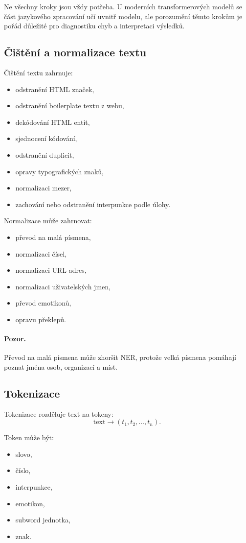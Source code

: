 Ne všechny kroky jsou vždy potřeba. U moderních transformerových modelů se část jazykového zpracování učí
uvnitř modelu, ale porozumění těmto krokům je pořád důležité pro diagnostiku chyb a interpretaci výsledků.

\subsection{Čištění a normalizace textu}

Čištění textu zahrnuje:
\begin{itemize}
    \item odstranění HTML značek,
    \item odstranění boilerplate textu z webu,
    \item dekódování HTML entit,
    \item sjednocení kódování,
    \item odstranění duplicit,
    \item opravy typografických znaků,
    \item normalizaci mezer,
    \item zachování nebo odstranění interpunkce podle úlohy.
\end{itemize}

Normalizace může zahrnovat:
\begin{itemize}
    \item převod na malá písmena,
    \item normalizaci čísel,
    \item normalizaci URL adres,
    \item normalizaci uživatelských jmen,
    \item převod emotikonů,
    \item opravu překlepů.
\end{itemize}

\paragraph{Pozor.}
Převod na malá písmena může zhoršit NER, protože velká písmena pomáhají poznat jména osob, organizací a míst.

\subsection{Tokenizace}

Tokenizace rozděluje text na tokeny:
\[
\text{text}
\rightarrow
(t_1,t_2,\ldots,t_n).
\]

Token může být:
\begin{itemize}
    \item slovo,
    \item číslo,
    \item interpunkce,
    \item emotikon,
    \item subword jednotka,
    \item znak.
\end{itemize}

